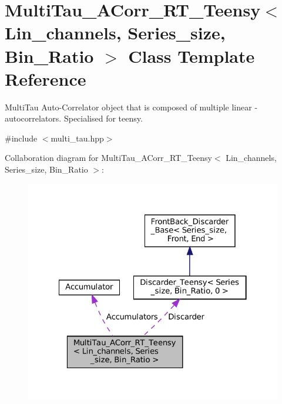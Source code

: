 \hypertarget{classMultiTau__ACorr__RT__Teensy}{}\section{Multi\+Tau\+\_\+\+A\+Corr\+\_\+\+R\+T\+\_\+\+Teensy$<$ Lin\+\_\+channels, Series\+\_\+size, Bin\+\_\+\+Ratio $>$ Class Template Reference}
\label{classMultiTau__ACorr__RT__Teensy}


Multi\+Tau Auto-\/\+Correlator object that is composed of multiple linear -\/ autocorrelators. Specialised for teensy.  




{\ttfamily \#include $<$multi\+\_\+tau.\+hpp$>$}



Collaboration diagram for Multi\+Tau\+\_\+\+A\+Corr\+\_\+\+R\+T\+\_\+\+Teensy$<$ Lin\+\_\+channels, Series\+\_\+size, Bin\+\_\+\+Ratio $>$\+:
\nopagebreak
\begin{figure}[H]
\begin{center}
\leavevmode
\includegraphics[width=322pt]{classMultiTau__ACorr__RT__Teensy__coll__graph}
\end{center}
\end{figure}
